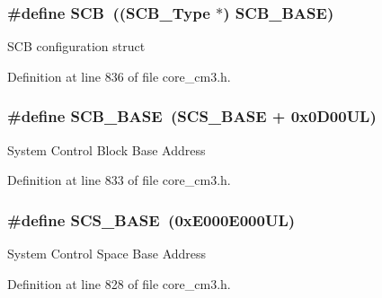 \hypertarget{group___c_m_s_i_s__core__register_gaaaf6477c2bde2f00f99e3c2fd1060b01}{
\subsubsection[{\-S\-C\-B}]{\setlength{\rightskip}{0pt plus 5cm}\#define {\bf \-S\-C\-B}~(({\bf \-S\-C\-B\-\_\-\-Type} $\ast$)           {\bf \-S\-C\-B\-\_\-\-B\-A\-S\-E})}}\label{group___c_m_s_i_s__core__register_gaaaf6477c2bde2f00f99e3c2fd1060b01}
\-S\-C\-B configuration struct 

\-Definition at line 836 of file core\-\_\-cm3.\-h.

\hypertarget{group___c_m_s_i_s__core__register_gad55a7ddb8d4b2398b0c1cfec76c0d9fd}{
\subsubsection[{\-S\-C\-B\-\_\-\-B\-A\-S\-E}]{\setlength{\rightskip}{0pt plus 5cm}\#define {\bf \-S\-C\-B\-\_\-\-B\-A\-S\-E}~({\bf \-S\-C\-S\-\_\-\-B\-A\-S\-E} +  0x0\-D00\-U\-L)}}\label{group___c_m_s_i_s__core__register_gad55a7ddb8d4b2398b0c1cfec76c0d9fd}
\-System \-Control \-Block \-Base \-Address 

\-Definition at line 833 of file core\-\_\-cm3.\-h.

\hypertarget{group___c_m_s_i_s__core__register_ga3c14ed93192c8d9143322bbf77ebf770}{
\subsubsection[{\-S\-C\-S\-\_\-\-B\-A\-S\-E}]{\setlength{\rightskip}{0pt plus 5cm}\#define {\bf \-S\-C\-S\-\_\-\-B\-A\-S\-E}~(0x\-E000\-E000\-U\-L)}}\label{group___c_m_s_i_s__core__register_ga3c14ed93192c8d9143322bbf77ebf770}
\-System \-Control \-Space \-Base \-Address 

\-Definition at line 828 of file core\-\_\-cm3.\-h.

